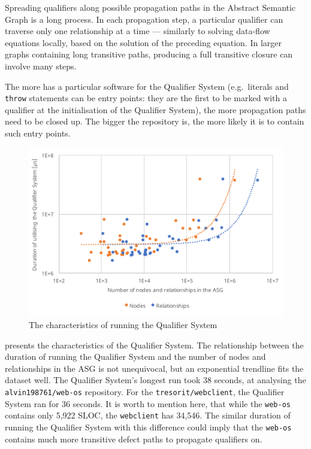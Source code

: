 Spreading qualifiers along possible propagation paths in the Abstract Semantic Graph is a long process. In each propagation step, a particular qualifier can traverse only one relationship at a time — similarly to solving data-flow equations locally, based on the solution of the preceding equation. In larger graphs containing long transitive paths, producing a full transitive closure can involve many steps.

The more  has a particular software for the Qualifier System (e.g.\ literals and \lstinline{throw} statements can be entry points: they are the first to be marked with a qualifier at the initialisation of the Qualifier System), the more propagation paths need to be closed up. The bigger the repository is, the more likely it is to contain such entry points.

\begin{figure}[!htb]
	\centerfloat
	\includegraphics[width=\textwidth,clip]{figures/measurement-qualifiersystem-nodes-relationships.pdf}
	\caption{The characteristics of running the Qualifier System}
	\label{fig:measurement-qualifiersystem-nodes-relationships}
\end{figure}

 presents the characteristics of the Qualifier System. The relationship between the duration of running the Qualifier System and the number of nodes and relationships in the ASG is not unequivocal, but an exponential trendline fits the dataset well. The Qualifier System's longest run took 38 seconds, at analysing the \lstinline{alvin198761/web-os} repository. For the \lstinline{tresorit/webclient}, the Qualifier System ran for 36 seconds. It is worth to mention here, that while the \lstinline{web-os} contains only 5,922 SLOC, the \lstinline{webclient} has 34,546. The similar duration of running the Qualifier System with this difference could imply that the \lstinline{web-os} contains much more transitive defect paths to propagate qualifiers on.


